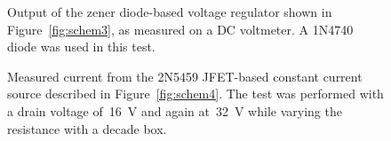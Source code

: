 \begin{figure}[H]
	\centering
	
	\parbox{4.25in}{
	\caption{Output of the zener diode-based voltage regulator shown in
		Figure~\ref{fig:schem3}, as measured on a DC voltmeter.  A 1N4740 diode
		was used in this test.}
	\label{fig:ckt3plot}}
\end{figure}

\begin{figure}[H]
	\centering
	
	\parbox{4.25in}{
	\caption{Measured current from the 2N5459 JFET-based constant current
		source described in Figure~\ref{fig:schem4}.  The test was performed
		with a drain voltage of~\SI{16}{\volt} and again at~\SI{32}{\volt}
		while varying the resistance with a decade box.}
	\label{fig:ckt4plot}}
\end{figure}
